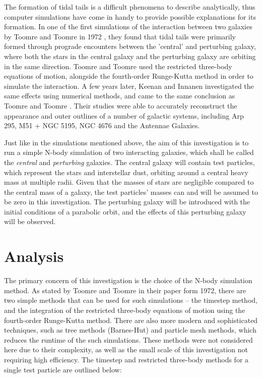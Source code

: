 \documentclass[twoside,twocolumn]{article}
\begin{document}
    The formation of tidal tails is a difficult phenomena to describe analytically, thus computer simulations have come in handy to provide possible explanations for its formation. In one of the first simulations of the interaction between two galaxies by Toomre and Toomre in 1972 \cite{toomre}, they found that tidal tails were primarily formed through prograde encounters between the 'central' and perturbing galaxy, where both the stars in the central galaxy and the perturbing galaxy are orbiting in the same direction. Toomre and Toomre used the restricted three-body equations of motion, alongside the fourth-order Runge-Kutta method in order to simulate the interaction. A few years later, Keenan and Innanen investigated the same effects using numerical methods, and came to the same conclusion as Toomre and Toomre \cite{keenan}. Their studies were able to accurately reconstruct the appearance and outer outlines of a number of galactic systems, including Arp 295, M51 + NGC 5195, NGC 4676 and the Antennae Galaxies.

    Just like in the simulations mentioned above, the aim of this investigation is to run a simple N-body simulation of two interacting galaxies, which shall be called the \emph{central} and \emph{perturbing} galaxies. The central galaxy will contain test particles, which represent the stars and interstellar dust, orbiting around a central heavy mass at multiple radii. Given that the masses of stars are negligible compared to the central mass of a galaxy, the test particles' masses can and will be assumed to be zero in this investigation. The perturbing galaxy will be introduced with the initial conditions of a parabolic orbit, and the effects of this perturbing galaxy will be observed.


\section{Analysis}    

    The primary concern of this investigation is the choice of the N-body simulation method. As stated by Toomre and Toomre in their paper form 1972, there are two simple methods that can be used for such simulations -- the timestep method, and the integration of the restricted three-body equations of motion using the fourth-order Runge-Kutta method. There are also more modern and sophisticated techniques, such as tree methods (Barnes-Hut) and particle mesh methods, which reduces the runtime of the such simulations. These methods were not considered here due to their complexity, as well as the small scale of this investigation not requiring high efficiency. The timestep and restricted three-body methods for a single test particle are outlined below:
    \vspace{0.2cm}
\end{document}
